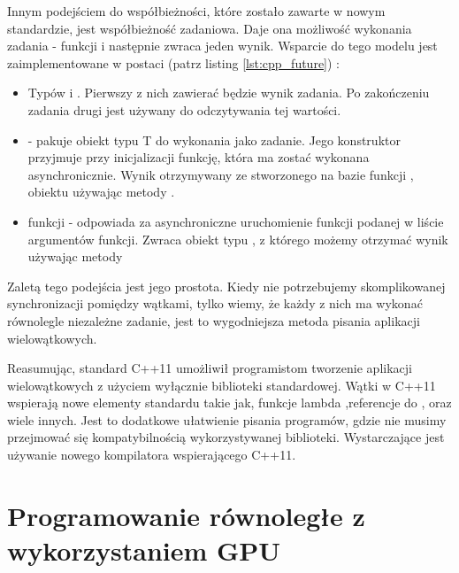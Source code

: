 \documentclass[document.tex]{subfiles}
\begin{document}
\indent Innym podejściem do współbieżności, które zostało zawarte w nowym standardzie,
jest współbieżność zadaniowa. Daje ona możliwość wykonania zadania - funkcji i  następnie zwraca
jeden wynik. Wsparcie do tego modelu jest zaimplementowane w postaci\cite{C++_ref}\cite{C++_Meyers}
(patrz listing \ref{lst:cpp_future}) :
\begin{itemize}
\item Typów  i . Pierwszy z nich zawierać będzie wynik 
zadania. Po zakończeniu zadania drugi jest używany do odczytywania tej wartości. 
\item {} - pakuje obiekt typu T do wykonania jako zadanie. Jego konstruktor
przyjmuje przy inicjalizacji funkcję, która ma zostać wykonana asynchronicznie. Wynik otrzymywany ze
stworzonego na bazie funkcji , obiektu  używając metody .
\item funkcji  - odpowiada za asynchroniczne uruchomienie funkcji podanej w liście argumentów funkcji. 
Zwraca obiekt typu , z którego możemy otrzymać wynik używając metody 
\end{itemize}


 
Zaletą tego podejścia jest jego prostota. Kiedy nie potrzebujemy skomplikowanej synchronizacji pomiędzy wątkami,
tylko wiemy, że każdy z nich ma wykonać równolegle niezależne zadanie, jest to wygodniejsza
 metoda pisania aplikacji wielowątkowych. 
\cite{C++_Meyers}\cite{C++_Stroustrup}

\indent Reasumując, standard C++11 umożliwił programistom tworzenie 
aplikacji wielowątkowych z użyciem wyłącznie biblioteki standardowej.
Wątki w C++11 wspierają nowe elementy standardu takie jak, 
funkcje lambda ,referencje do ,  oraz wiele innych. Jest to dodatkowe ułatwienie pisania programów, gdzie nie musimy
przejmować się kompatybilnością wykorzystywanej biblioteki. Wystarczające 
jest używanie nowego kompilatora wspierającego C++11. 



\clearpage


\section{Programowanie równoległe z wykorzystaniem GPU}
\end{document}
